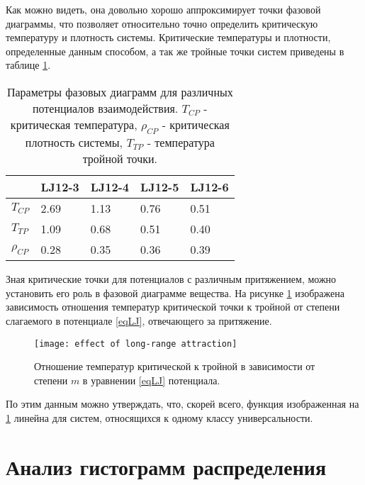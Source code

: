 Как можно видеть, она довольно хорошо аппроксимирует точки фазовой диаграммы, что позволяет относительно точно определить критическую температуру и плотность системы.
Критические температуры и плотности, определенные данным способом, а так же тройные точки систем приведены в таблице \ref{tablSystemConst}.

\begin{table}[h]
\begin{center}
\begin{tabular}{| l | l | l | l | l |}
\hline
    & LJ12-3 & LJ12-4 & LJ12-5 & LJ12-6         \\ \hline
$T_{CP}$    & 2.69  &  1.13   &  0.76  &    0.51   \\ \hline
$T_{TP}$    & 1.09  & 0.68    & 0.51   & 0.40   \\ \hline
$\rho_{CP}$ & 0.28  &  0.35   &  0.36   &  0.39   \\ \hline
\end{tabular}
\end{center}
\caption{Параметры фазовых диаграмм для различных потенциалов взаимодействия. $T_{CP}$ - критическая температура, $\rho_{CP}$ - критическая плотность системы, $T_{TP}$ - температура тройной точки.}
\label{tablSystemConst}
\end{table}

Зная критические точки для потенциалов с различным притяжением, можно установить его роль в фазовой диаграмме вещества. На рисунке \ref{risTcpTtp} изображена зависимость отношения температур критической точки к тройной от степени слагаемого в потенциале \ref{eqLJ}, отвечающего за притяжение. 

\begin{figure}[h]
\begin{center}
\texttt{[image: effect of long-range attraction]}
\caption{Отношение температур критической к тройной в зависимости от степени $m$ в уравнении \ref{eqLJ} потенциала.}
\label{risTcpTtp}
\end{center}
\end{figure}

По этим данным можно утверждать, что, скорей всего, функция изображенная на \ref{risTcpTtp} линейна для систем, относящихся к одному классу универсальности.


\section{Анализ гистограмм распределения}\label{C2_3}


